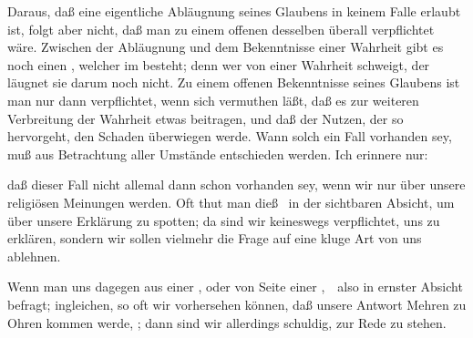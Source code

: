\begin{RWanm}
Daraus, daß eine eigentliche Abläugnung seines Glaubens in keinem Falle erlaubt ist, folgt aber nicht, daß man zu einem offenen  desselben überall verpflichtet wäre. Zwischen der Abläugnung und dem Bekenntnisse einer Wahrheit gibt es noch einen , welcher im  besteht; denn wer von einer Wahrheit schweigt, der läugnet sie darum noch nicht. Zu einem offenen Bekenntnisse seines Glaubens ist man nur dann verpflichtet, wenn sich vermuthen läßt, daß es zur weiteren Verbreitung der Wahrheit etwas beitragen, und daß der Nutzen, der so hervorgeht, den Schaden überwiegen werde. Wann solch ein Fall vorhanden sey, muß aus Betrachtung aller Umstände entschieden werden. Ich erinnere nur:
\begin{aufzb}
\item daß dieser Fall nicht allemal dann schon vorhanden sey, wenn wir nur über unsere religiösen Meinungen  werden. Oft thut man dieß \zB\ in der sichtbaren Absicht, um über unsere Erklärung zu spotten; da sind wir keineswegs verpflichtet, uns zu erklären, sondern wir sollen vielmehr die Frage auf eine kluge Art von uns ablehnen.
\item Wenn man uns dagegen aus einer , oder von Seite einer ,~\ also in ernster Absicht befragt; ingleichen, so oft wir vorhersehen können, daß unsere Antwort Mehren zu Ohren kommen werde, \udgl ; dann sind wir allerdings schuldig, zur Rede zu stehen.
\end{aufzb}
\end{RWanm}

